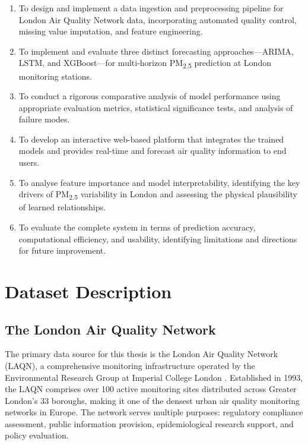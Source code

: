 \begin{enumerate}
    \item To design and implement a data ingestion and preprocessing pipeline for London Air Quality Network data, incorporating automated quality control, missing value imputation, and feature engineering.
    
    \item To implement and evaluate three distinct forecasting approaches---ARIMA, LSTM, and XGBoost---for multi-horizon PM\textsubscript{2.5} prediction at London monitoring stations.
    
    \item To conduct a rigorous comparative analysis of model performance using appropriate evaluation metrics, statistical significance tests, and analysis of failure modes.
    
    \item To develop an interactive web-based platform that integrates the trained models and provides real-time and forecast air quality information to end users.
    
    \item To analyse feature importance and model interpretability, identifying the key drivers of PM\textsubscript{2.5} variability in London and assessing the physical plausibility of learned relationships.
    
    \item To evaluate the complete system in terms of prediction accuracy, computational efficiency, and usability, identifying limitations and directions for future improvement.
\end{enumerate}

\section{Dataset Description}
\label{sec:dataset}

\subsection{The London Air Quality Network}
\label{subsec:laqn}

The primary data source for this thesis is the London Air Quality Network (LAQN), a comprehensive monitoring infrastructure operated by the Environmental Research Group at Imperial College London \cite{laqn2024}. Established in 1993, the LAQN comprises over 100 active monitoring sites distributed across Greater London's 33 boroughs, making it one of the densest urban air quality monitoring networks in Europe. The network serves multiple purposes: regulatory compliance assessment, public information provision, epidemiological research support, and policy evaluation.

